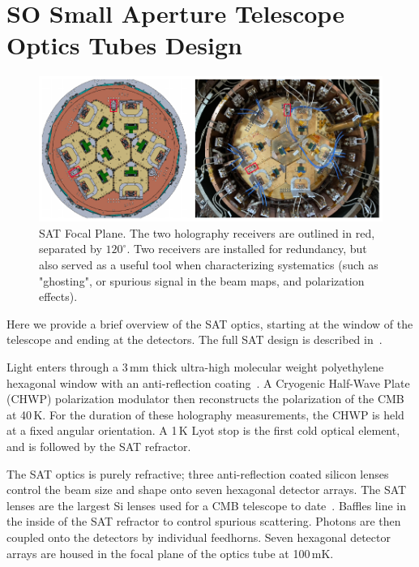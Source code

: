 \section{SO Small Aperture Telescope Optics Tubes Design}
\label{sec:sat_optics_tube}

\begin{figure}[t!]
    \centering
    \includegraphics[width = \textwidth]{Figures/sat_fpa.pdf}
    \caption{SAT Focal Plane.  The two holography receivers are outlined in red, separated by $120^{\circ}$.  Two receivers are installed for redundancy, but also served as a useful tool when characterizing systematics (such as "ghosting", or spurious signal in the beam maps, and polarization effects).}
    \label{fig:sat_fpa}
\end{figure}

Here we provide a brief overview of the SAT optics, starting at the window of the telescope and ending at the detectors.  The full SAT design is described in~\cite{ali20,2020SPIE11445E7LK}.


Light enters through a 3\,mm thick ultra-high molecular weight polyethylene hexagonal window with an anti-reflection coating~\cite{zhu18}.  A Cryogenic Half-Wave Plate (CHWP) polarization modulator then reconstructs the polarization of the CMB at 40\,K.  For the duration of these holography measurements, the CHWP is held at a fixed angular orientation.  A 1\,K Lyot stop is the first cold optical element, and is followed by the SAT refractor.

The SAT optics is purely refractive; three anti-reflection coated silicon lenses~\cite{Datta:13,golec20} control the beam size and shape onto seven hexagonal detector arrays.  The SAT lenses are the largest Si lenses used for a CMB telescope to date~\cite{ali20}.  Baffles line in the inside of the SAT refractor to control spurious scattering.  Photons are then coupled onto the detectors by individual feedhorns. Seven hexagonal detector arrays are housed in the focal plane of the optics tube at 100\,mK.

